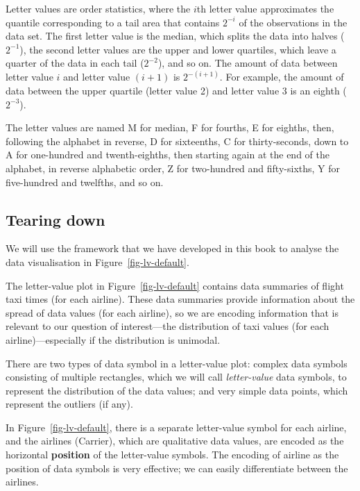 \documentclass[
  letterpaper,
  DIV=11,
  numbers=noendperiod]{scrreprt}
\providecommand{\tightlist}{%
  \setlength{\itemsep}{0pt}\setlength{\parskip}{0pt}}
\begin{document}
Letter values are order statistics, where the \(i\)th letter value
approximates the quantile corresponding to a tail area that contains
\(2^{−i}\) of the observations in the data set. The first letter value
is the median, which splits the data into halves (\(2^{-1}\)), the
second letter values are the upper and lower quartiles, which leave a
quarter of the data in each tail (\(2^{-2}\)), and so on. The amount of
data between letter value \(i\) and letter value \((i+1)\) is
\(2^{-(i+1)}\). For example, the amount of data between the upper
quartile (letter value 2) and letter value 3 is an eighth (\(2^{-3}\)).

The letter values are named M for median, F for fourths, E for eighths,
then, following the alphabet in reverse, D for sixteenths, C for
thirty-seconds, down to A for one-hundred and twenth-eighths, then
starting again at the end of the alphabet, in reverse alphabetic order,
Z for two-hundred and fifty-sixths, Y for five-hundred and twelfths, and
so on.

\subsection{Tearing down}\label{tearing-down}

We will use the framework that we have developed in this book to analyse
the data visualisation in Figure~\ref{fig-lv-default}.

\begin{description}
\tightlist
\item[Encoded information]
The letter-value plot in Figure~\ref{fig-lv-default} contains data
summaries of flight taxi times (for each airline). These data summaries
provide information about the spread of data values (for each airline),
so we are encoding information that is relevant to our question of
interest---the distribution of taxi values (for each
airline)---especially if the distribution is unimodal.
\item[Data symbols]
There are two types of data symbol in a letter-value plot: complex data
symbols consisting of multiple rectangles, which we will call
\emph{letter-value} data symbols, to represent the distribution of the
data values; and very simple data points, which represent the outliers
(if any).
\item[Encoding visual features]
In Figure~\ref{fig-lv-default}, there is a separate letter-value symbol
for each airline, and the airlines (Carrier), which are qualitative data
values, are encoded as the horizontal \textbf{position} of the
letter-value symbols. The encoding of airline as the position of data
symbols is very effective; we can easily differentiate between the
airlines.
\end{description}
\end{document}
